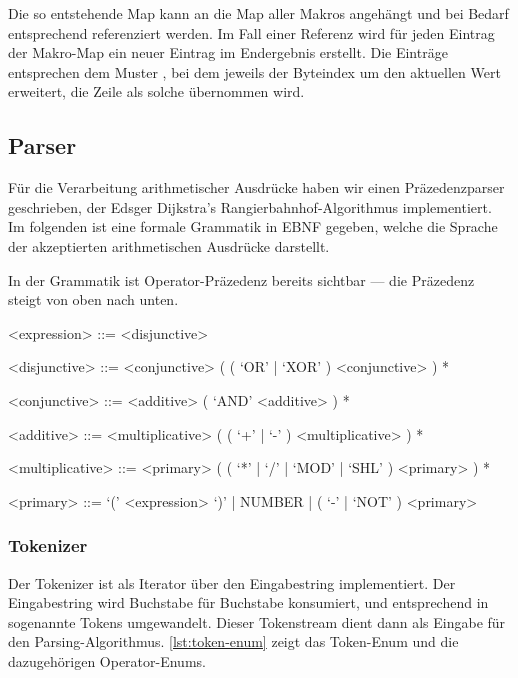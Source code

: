 \qquad{}

Die so entstehende Map kann an die Map aller Makros angehängt und bei Bedarf entsprechend referenziert werden. Im Fall einer Referenz wird für jeden Eintrag der Makro-Map ein neuer Eintrag im Endergebnis erstellt. Die Einträge entsprechen dem Muster , bei dem jeweils der Byteindex um den aktuellen Wert erweitert, die Zeile als solche übernommen wird.

\subsection{Parser}

Für die Verarbeitung arithmetischer Ausdrücke haben wir einen Präzedenzparser geschrieben, der Edsger Dijkstra's Rangierbahnhof-Algorithmus implementiert. Im folgenden ist eine formale Grammatik in \ac{EBNF} gegeben, welche die Sprache der akzeptierten arithmetischen Ausdrücke darstellt.

In der Grammatik ist Operator-Präzedenz bereits sichtbar --- die Präzedenz steigt von oben nach unten.

\begin{grammar}

<expression> ::= <disjunctive>

<disjunctive> ::= <conjunctive> ( ( `OR' | `XOR' ) <conjunctive> ) *

<conjunctive> ::= <additive> ( `AND' <additive> ) *

<additive> ::= <multiplicative> ( ( `+' | `-' ) <multiplicative> ) *

<multiplicative> ::= <primary> ( ( `*' | `/' | `MOD' | `SHL' ) <primary> ) *

<primary> ::= `(' <expression> `)' | NUMBER | ( `-' | `NOT' ) <primary>

\end{grammar}

\subsubsection{Tokenizer}

Der Tokenizer ist als Iterator über den Eingabestring implementiert. Der Eingabestring wird Buchstabe für Buchstabe konsumiert, und entsprechend in sogenannte Tokens umgewandelt. Dieser Tokenstream dient dann als Eingabe für den Parsing-Algorithmus.
\cref{lst:token-enum} zeigt das Token-Enum und die dazugehörigen Operator-Enums.

